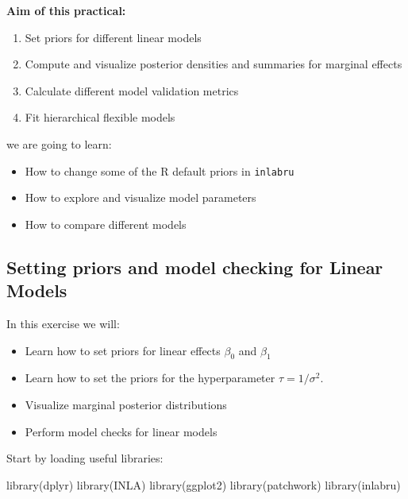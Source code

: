 \documentclass[
  letterpaper,
  DIV=11,
  numbers=noendperiod]{scrartcl}
\author{}
\date{}
\newenvironment{Shaded}{\begin{snugshade}}{\end{snugshade}}
\newcommand{\FunctionTok}[1]{\textcolor[rgb]{0.28,0.35,0.67}{#1}}
\newcommand{\NormalTok}[1]{\textcolor[rgb]{0.00,0.23,0.31}{#1}}
\providecommand{\tightlist}{%
  \setlength{\itemsep}{0pt}\setlength{\parskip}{0pt}}\usepackage{longtable,booktabs,array}
\begin{document}
\pagestyle{mystyle}


\textbf{Aim of this practical:}

\begin{enumerate}
\def\labelenumi{\arabic{enumi}.}
\tightlist
\item
  Set priors for different linear models
\item
  Compute and visualize posterior densities and summaries for marginal
  effects
\item
  Calculate different model validation metrics
\item
  Fit hierarchical flexible models
\end{enumerate}

we are going to learn:

\begin{itemize}
\tightlist
\item
  How to change some of the R default priors in \texttt{inlabru}
\item
  How to explore and visualize model parameters
\item
  How to compare different models
\end{itemize}

\subsection{Setting priors and model checking for Linear
Models}\label{setting-priors-and-model-checking-for-linear-models}

In this exercise we will:

\begin{itemize}
\tightlist
\item
  Learn how to set priors for linear effects \(\beta_0\) and \(\beta_1\)
\item
  Learn how to set the priors for the hyperparameter
  \(\tau = 1/\sigma^2\).
\item
  Visualize marginal posterior distributions
\item
  Perform model checks for linear models
\end{itemize}

Start by loading useful libraries:

\begin{Shaded}
\begin{Highlighting}[]
\FunctionTok{library}\NormalTok{(dplyr)}
\FunctionTok{library}\NormalTok{(INLA)}
\FunctionTok{library}\NormalTok{(ggplot2)}
\FunctionTok{library}\NormalTok{(patchwork)}
\FunctionTok{library}\NormalTok{(inlabru)     }
\end{Highlighting}
\end{Shaded}
\end{document}
